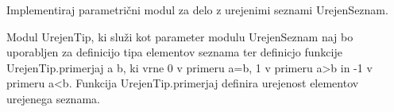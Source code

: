 \begin{ex}
Implementiraj parametri\v cni modul za delo z urejenimi seznami UrejenSeznam. 

Modul UrejenTip, ki slu\v zi kot parameter modulu UrejenSeznam naj bo uporabljen za definicijo tipa elementov seznama ter definicjo funkcije UrejenTip.primerjaj a b, ki vrne 0 v primeru a=b, 1 v primeru a>b in -1 v primeru a<b. Funkcija UrejenTip.primerjaj definira urejenost elementov urejenega seznama.
\end{ex}
